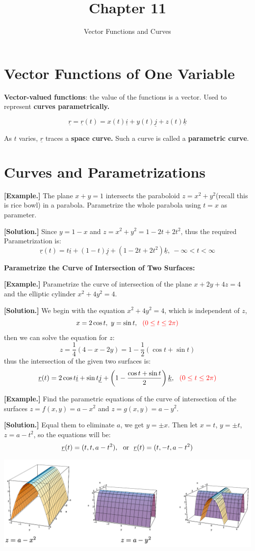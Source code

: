 \documentclass[11pt, a4paper]{MATH2023}
\title{Chapter 11}
\subtitle{Vector Functions and Curves}
\newcommand{\eg}{\textbf{[Example.] }}
\newcommand{\sol}{\textbf{[Solution.] }}
\newcommand{\rr}{\underline{r}}
\newcommand{\ii}{\underline{i}}
\newcommand{\kk}{\underline{k}}
\newcommand{\jj}{\underline{j}}
\begin{document}
\begin{spacing}{1.3}

    \section{Vector Functions of One Variable}

    {\bf Vector-valued functions}: the value of the functions is a vector.
    Used to represent {\bf curves parametrically.}

    $$\rr=\rr(t)=x(t)\ii+y(t)\jj+z(t)\kk$$

    As $t$ varies, $\rr$ traces a {\bf space curve.} Such a curve is 
    called a {\bf parametric curve}.


    \section{Curves and Parametrizations}

    \eg The plane $x + y = 1$ intersects the paraboloid $z = x^2 + y^2$({\blue recall this is rice bowl})
    in a parabola. Parametrize the whole parabola using $t = x$ as parameter. 

    \sol Since $y=1-x$ and $z=x^2+y^2=1-2t+2t^2$, thus the required Parametrization is: 
    $$\rr(t)=t\ii+(1-t)\jj+(1-2t+2t^2)\kk,\ -\infty < t < \infty$$ 


    {\bf Parametrize the Curve of Intersection of Two Surfaces:}

    \eg Parametrize the curve of intersection of the plane $x +2y +4z = 4$ 
    and the elliptic cylinder $x^2 + 4y^2 = 4$.

    \sol We begin with the equation $x^2 +4y^2 = 4$, which is independent of $z$,
    $$x=2\cos t,\ y=\sin t,\ \ \color{red}{(0\le t\le 2\pi)}$$
    then we can solve the equation for $z$: 
    $$z=\frac{1}{4}(4-x-2y)=1-\frac{1}{2}(\cos t+\sin t)$$
    thus the intersection of the given two surfaces is: 
    $$\rr (t)=2\cos t\ii + \sin t\jj+ \left(1-\frac{\cos t+\sin t}{2}\right)\kk,
    \ \ \red{(0\le t\le 2\pi)}$$

    \eg Find the parametric equations of the curve of intersection of the surfaces 
    $z=f(x,y)=a-x^2$ and $z=g(x,y)=a-y^2$.

    \sol Equal them to eliminate $a$, we get $y=\pm x$. Then let $x=t$, $y=\pm t$,
    $z=a-t^2$, so the equations will be: 
    $$\rr(t)=(t,t,a-t^2),\ \ {\rm or}\ \  \rr(t)=(t,-t,a-t^2)$$
    \begin{center}
        \includegraphics[scale=0.42]{images/Ch11-parametric-intersection-surfaces.png}
    \end{center}




\end{spacing}
\end{document}
